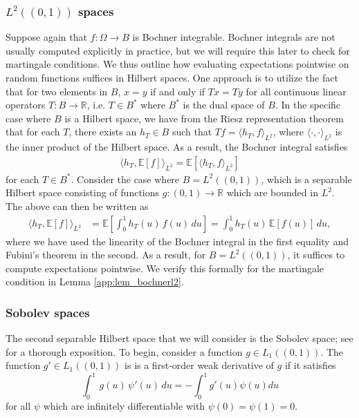 \documentclass[11pt,a4paper]{article}
\newcommand{\R}{\mathbb{R}}
\newcommand{\E}{\mathbb{E}}
\begin{document}
\begin{appendices}
\subsubsection{$L^2((0,1))$ spaces}
Suppose again that $f: \Omega \to B$ is Bochner integrable. Bochner integrals are not usually computed explicitly in practice, but we will require this later to check for martingale conditions. We thus outline how evaluating expectations pointwise on random functions suffices in Hilbert spaces.
One approach is to utilize the fact that for two elements in $B$, $x = y$ if and only if $Tx = Ty$ for all continuous linear operators $T: B \to \R$, i.e. $T \in B^*$ where $B^*$ is the dual space of $B$. 
In the specific case where $B$ is a Hilbert space, we have from the Riesz representation theorem that for each $T$, there exists an $h_T\in B$ such that $Tf = \langle h_T, f \rangle_{L^2}$, where $\langle \cdot, \cdot \rangle_{L^2}$ is the inner product of the Hilbert space. As a result, the Bochner integral satisfies
\begin{align*}
    \langle h_T, \E\left[f \right]  \rangle_{L^2} =\E\left[ \langle h_T, f \rangle_{L^2}\right] 
\end{align*}
for each $T \in B^*$. Consider the case where $B = L^2((0,1))$, which is a separable Hilbert space consisting of functions $g:(0,1) \to \R$ which are bounded in $L^2$. The above can then be written as
\begin{align*}
   \langle h_T, \E\left[f \right]  \rangle_{L^2}  &= \E\left[\int_0^1 h_T(u)\, f(u)\, du\right]
   = \int_0^1 h_T(u)\,\E\left[ f(u)\right]\, du,
\end{align*}
where we have used the linearity of the Bochner integral in the first equality and Fubini's theorem in the second. 
As a result, for $B = L^2((0,1))$, it suffices to compute expectations pointwise. We verify this formally for the martingale condition in {Lemma \ref{app:lem_bochnerl2}}. 



\subsubsection{Sobolev spaces}\label{app:sec_sobolev}
The second separable Hilbert space that we will consider is the Sobolev space; see \cite{Leoni2017} for a thorough exposition. To begin, consider a function $g \in L_1((0,1))$. The function $g' \in L_1((0,1))$ is 
is a first-order weak derivative of $g$ if it satisfies
$$\int_0^1 \, g(u) \, \psi'(u) \, du = - \int_0^1 g'(u) \psi(u) du$$
for all $\psi$ which are infinitely differentiable with $\psi(0) = \psi(1) = 0$. 


\end{appendices}
\end{document}
